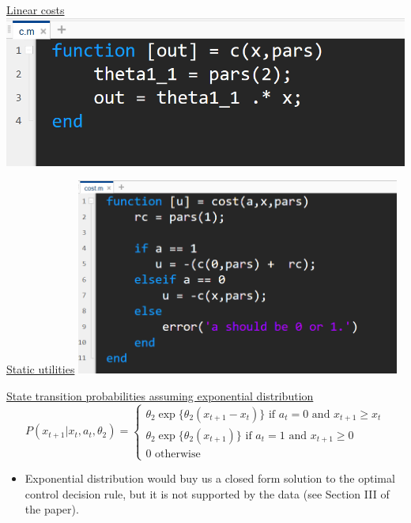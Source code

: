 \documentclass[aspectratio=169]{beamer}
\begin{document}
	\begin{frame}{\hyperlink{utilities}{Linear costs}}\label{c.m}
		\includegraphics[width=\textwidth]{figs/0_linear_cost.png}\end{frame}
	
	\begin{frame}{\hyperlink{utilities}{Static utilities}}\label{cost.m}
		\includegraphics[width=0.8\textwidth]{figs/0_static_utilities.PNG}\end{frame}
	
	\begin{frame}{\hyperlink{state}{State transition probabilities assuming exponential distribution}}\label{transprob_exponential}
		\begin{equation}
			P(x_{t+1}|x_t,a_t,\theta_2) = \begin{cases}
				\theta_2 \exp \{\theta_2 (x_{t+1}-x_t)\} \text{ if } a_t = 0 \text{ and } x_{t+1} \geq x_t \\
				\theta_2 \exp \{\theta_2(x_{t+1})\} \text{ if } a_t = 1 \text{ and } x_{t+1} \geq 0 \\
				0 \text{ otherwise}
			\end{cases}  
		\end{equation}
		\begin{itemize}
			\item Exponential distribution would buy us a closed form solution to the optimal control decision rule, but it is not supported by the data (see Section III of the paper). 
		\end{itemize}
		
	\end{frame}
	
\end{document}
